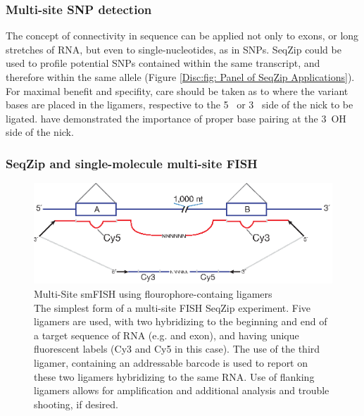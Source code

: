     \subsubsection{Multi-site SNP detection}
      \label{Disc:subsubsec: Multi-site SNP Detection}

      The concept of connectivity in sequence can be applied not only to exons, or long stretches of RNA, but even to single-nucleotides, as in SNPs. SeqZip could be used to profile potential SNPs contained within the same transcript, and therefore within the same allele (Figure \ref{Disc:fig: Panel of SeqZip Applications}). For maximal benefit and specifity, care should be taken as to where the variant bases are placed in the ligamers, respective to the 5\textprime~ or 3\textprime~ side of the nick to be ligated. \citet{Chauleau2013b} have demonstrated the importance of proper base pairing at the 3\textprime~OH side of the nick. 

    \subsubsection{SeqZip and single-molecule multi-site FISH}
      \label{Disc:subsubsec:SeqZip and Single-Molecule FISH}

      \begin{figure} %
        \centering 
        \includegraphics{Figures/Discussion/MultiSiteFish.eps}
        \caption[Multi-Site smFISH using flourophore-containg ligamers]
        {Multi-Site smFISH using flourophore-containg ligamers \\[0.25cm]
          The simplest form of a multi-site FISH SeqZip experiment. Five ligamers are used, with two hybridizing to the beginning and end of a target sequence of RNA (e.g. and exon), and having unique fluorescent labels (Cy3 and Cy5 in this case). The use of the third ligamer, containing an addressable barcode is used to report on these two ligamers hybridizing to the same RNA. Use of flanking ligamers allows for amplification and additional analysis and trouble shooting, if desired.
          }
        \label{Disc:fig:MultiSite FISH using SeqZip}
        \end{figure}

